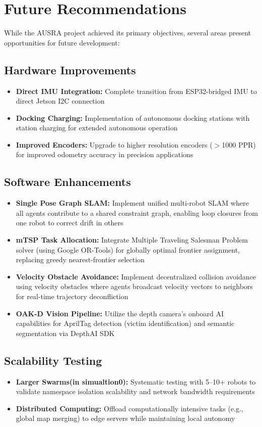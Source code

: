 \section{Future Recommendations}
\label{sec:future_work}

While the AUSRA project achieved its primary objectives, several areas present opportunities for future development:

\subsection{Hardware Improvements}
\begin{itemize}
    \item \textbf{Direct IMU Integration:} Complete transition from ESP32-bridged IMU to direct Jetson I2C connection
    \item \textbf{Docking Charging:} Implementation of autonomous docking stations with station charging for extended autonomous operation
    \item \textbf{Improved Encoders:} Upgrade to higher resolution encoders ($>$1000 PPR) for improved odometry accuracy in precision applications
\end{itemize}

\subsection{Software Enhancements}
\begin{itemize}
    \item \textbf{Single Pose Graph SLAM:} Implement unified multi-robot SLAM where all agents contribute to a shared constraint graph, enabling loop closures from one robot to correct drift in others
    \item \textbf{mTSP Task Allocation:} Integrate Multiple Traveling Salesman Problem solver (using Google OR-Tools) for globally optimal frontier assignment, replacing greedy nearest-frontier selection
    \item \textbf{Velocity Obstacle Avoidance:} Implement decentralized collision avoidance using velocity obstacles where agents broadcast velocity vectors to neighbors for real-time trajectory deconfliction
    \item \textbf{OAK-D Vision Pipeline:} Utilize the depth camera's onboard AI capabilities for AprilTag detection (victim identification) and semantic segmentation via DepthAI SDK
\end{itemize}

\subsection{Scalability Testing}
\begin{itemize}
    \item \textbf{Larger Swarms(in simualtion0):} Systematic testing with 5--10+ robots to validate namespace isolation scalability and network bandwidth requirements
    \item \textbf{Distributed Computing:} Offload computationally intensive tasks (e.g., global map merging) to edge servers while maintaining local autonomy
\end{itemize}

